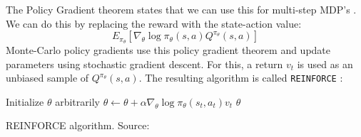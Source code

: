 \documentclass[a4paper]{article}
\begin{document}
The Policy Gradient theorem states that we can use this for multi-step MDP's \citep{Sutton1999PolicyApproximation}. We can do this by replacing the reward with the state-action value:
\begin{equation}
E_{\pi_{\theta}} [\nabla_{\theta} \log \pi_{\theta}(s,a)Q^{\pi_{\theta}}(s,a)]
\end{equation}
Monte-Carlo policy gradients use this policy gradient theorem and update parameters using stochastic gradient descent. For this, a return $v_t$ is used as an unbiased sample of $Q^{\pi_{\theta}}(s,a)$. The resulting algorithm is called \texttt{REINFORCE} \citep{williams1992simple}:\\
\begin{algorithm}[H]
\DontPrintSemicolon
Initialize $\theta$ arbitrarily\;
 {
	 {
    	$\theta \gets \theta + \alpha \nabla_{\theta} \log \pi_{\theta}(s_t,a_t)v_t$
    }
}
\Return $\theta$
\caption{REINFORCE algorithm. Source: \cite{Sutton1998ReinforcementIntroduction}}
\end{algorithm}
\end{document}
